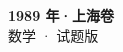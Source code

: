 \documentclass[zihao=-4, a4paper]{ctexart}
\begin{document}
\begin{center}
  {\Large\bfseries 1989 年·上海卷}\\[4pt]
  {\large 数学 · 试题版}
\end{center}
\medskip
{}

\end{document}
